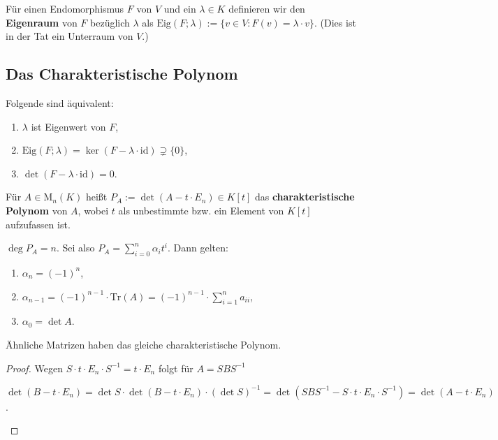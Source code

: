 \begin{definition} Für einen Endomorphismus $F$ von $V$ und ein $\lambda \in K$
definieren wir den \textbf{Eigenraum} von $F$ bezüglich $\lambda$ als
$\text{Eig}( F ; \lambda ) := \{ v \in V: F(v) = \lambda \cdot v \}$. (Dies ist
in der Tat ein Unterraum von $V$.)
\end{definition}

\subsection{Das Charakteristische Polynom}

\begin{bemerkung} Folgende sind äquivalent:
\begin{enumerate}[label=\roman*)]
\item $\lambda$ ist Eigenwert von $F$,
\item $\text{Eig}(F; \lambda) = \ker (F - \lambda \cdot \text{id}) \supsetneq
\{ 0 \}$,
\item $\det (F - \lambda \cdot \text {id}) = 0$.
\end{enumerate}
\end{bemerkung}

\begin{definition} Für $A \in \text{M}_n(K)$ heißt $P_A := \det (A - t \cdot
E_n) \in K[t]$ das \textbf{charakteristische Polynom} von $A$, wobei $t$ als
unbestimmte bzw. ein Element von $K[t]$ aufzufassen ist.
\end{definition}

\begin{bemerkung} $\deg P_A = n$. Sei also $P_A = \sum_{i=0}^n \alpha_i t^i $.
Dann gelten:
\begin{enumerate}[label = \roman*)]
\item $\alpha_n = (-1)^n$,
\item $\alpha_{n-1} = (-1)^{n-1} \cdot \text{Tr}(A) = (-1)^{n-1} \cdot
\sum_{i=1}^n a_{ii}$,
\item $\alpha_0 = \det A$.
\end{enumerate}
\end{bemerkung}

\begin{lemma} Ähnliche Matrizen haben das gleiche charakteristische Polynom.
\end{lemma}
\begin{proof}
Wegen $S \cdot t \cdot E_n \cdot S^{-1} = t \cdot E_n $ folgt
für $A = S B S^{-1}$
\begin{center}
$\det (B - t \cdot E_n) = \det S \cdot \det (B - t \cdot E_n) \cdot (\det S)^{-1}
= \det ( SBS^{-1} - S \cdot t \cdot E_n \cdot S^{-1}) =\det ( A - t \cdot E_n)$.
\end{center}
\end{proof}

